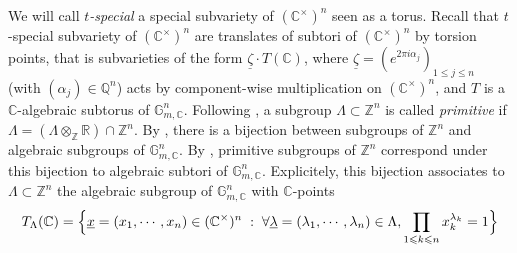 \documentclass[10pt]{article}
\numberwithin{equation}{subsection}
\theoremstyle{plain}
\theoremstyle{definition}
\theoremstyle{remark}
\newcommand{\Z}{\mathbb Z}
\newcommand{\Q}{\mathbb Q}
\newcommand{\C}{\mathbb C}
\newcommand{\R}{\mathbb R}
\newcommand{\mult}{\mathbb G}
\newcommand{\zetaa}{\underline{\zeta}}
\newcommand{\lambdaa}{\underline{\lambda}}
\newcommand{\xx}{\underline{x}}
\begin{document}
We will call \textit{$t$-special} a special subvariety of $(\C^\times)^n$ seen as a torus. Recall that $t$-special subvariety of $(\C^\times)^n$ are translates of subtori of $(\C^\times)^n$ by torsion points, that is subvarieties of the form $\zetaa \cdot T(\C)$, where $\zetaa = (e^{2 \pi i \alpha_j})_{1 \leqslant j \leqslant n}$ (with $(\alpha_j) \in \Q^n$) acts by component-wise multiplication on $(\C^\times)^n$, and $T$ is a $\C$-algebraic subtorus of $\mult_{m,\C}^n$. Following \cite[(3.2.6)]{bombgub}, a subgroup $\Lambda \subset \Z^n$ is called \textit{primitive} if $\Lambda = (\Lambda \otimes_\Z \R) \cap \Z^n$. By \cite[Thm. 3.2.19]{bombgub}, there is a bijection between subgroups of $\Z^n$ and algebraic subgroups of $\mult_{m,\C}^n$. By \cite[Cor. 3.2.8]{bombgub}, primitive subgroups of $\Z^n$ correspond under this bijection to algebraic subtori of $\mult_{m,\C}^n$. Explicitely, this bijection associates to $\Lambda \subset \Z^n$ the algebraic subgroup of $\mult_{m,\C}^n$ with $\C$-points
\[
T_\Lambda(\C) = \Big\{\xx = (x_1, \cdots, x_n) \in (\C^\times)^n \hspace{0.1cm} : \hspace{0.1cm} \forall \lambdaa = (\lambda_1, \cdots, \lambda_n) \in \Lambda, \prod_{1 \leqslant k \leqslant n} x_k^{\lambda_k} = 1\Big\}
\]
\end{document}
